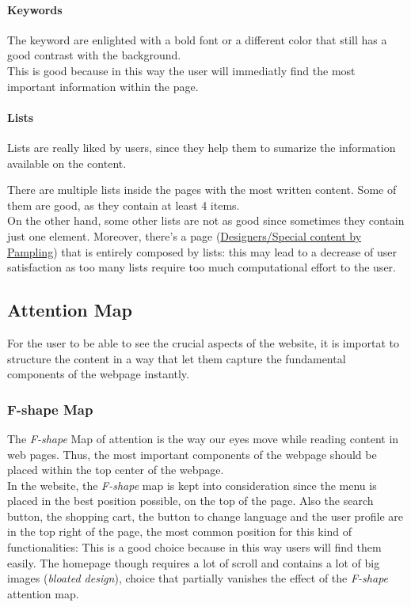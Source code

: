 \paragraph{Keywords}
The keyword are enlighted with a bold font or a different color that still has a good contrast with the background.\\
This is good because in this way the user will immediatly find the most important information within the page.

\paragraph{Lists}
Lists are really liked by users, since they help them to sumarize the information available on the content.

There are multiple lists inside the pages with the most written content. Some of them are good, as they contain
at least 4 items. \\
On the other hand, some other lists are not as good since sometimes they contain just one element. 
Moreover, there's a page (\href{https://www.pampling.com/}{Designers/Special content by Pampling}) that is 
entirely composed by lists: this may lead to a decrease of user satisfaction as too many lists require too much computational
effort to the user.

\subsection{Attention Map}
For the user to be able to see the crucial aspects of the website, it is importat to structure the content in a way that let
them capture the fundamental components of the webpage instantly.

\subsubsection{F-shape Map}
The \textit{F-shape} Map of attention is the way our eyes move while reading content in web pages. Thus, the most important 
components of the webpage should be placed within the top center of the webpage. \\
In the website, the \textit{F-shape} map is kept into consideration since the menu is placed in the best 
position possible, on the top of the page. Also the search button, the shopping cart, the button to change language 
and the user profile are in the top right of the page, the most common position for this kind of functionalities: 
This is a good choice because in this way users will find them easily. 
The homepage though requires a lot of scroll and contains a lot of big images (\textit{bloated design}), choice that partially 
vanishes the effect of the \textit{F-shape} attention map.

